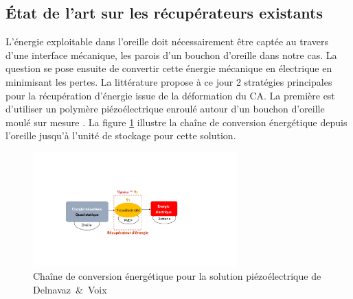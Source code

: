 	\subsection{État de l'art sur les récupérateurs existants}
	\label{subsec:1.4.3_Etat de l art sur les recuperateurs existants}
L'énergie exploitable dans l'oreille doit nécessairement être captée au travers d'une interface mécanique, les parois d'un bouchon d'oreille dans notre cas. La question se pose ensuite de convertir cette énergie mécanique en électrique en minimisant les pertes. La littérature propose à ce jour 2 stratégies principales pour la récupération d'énergie issue de la déformation du CA. La première est d'utiliser un polymère piézoélectrique enroulé autour d'un bouchon d'oreille moulé sur mesure \cite{Delnavaz2013}. La figure \ref{fig:conversion_critias_pvdf} illustre la chaîne de conversion énergétique depuis l'oreille jusqu'à l'unité de stockage pour cette solution.
\begin{figure}[!htbp]
\begin{center}
    \captionsetup{justification=centering}
	\includegraphics[trim={5cm 5cm 7cm 6cm},clip, width=0.7\textwidth]{../Chap2/Figure/conversion_critias_pvdf.pdf}
	\caption{Chaîne de conversion énergétique pour la solution piézoélectrique de \mbox{Delnavaz \& Voix \cite{Delnavaz2013}}}
	\label{fig:conversion_critias_pvdf}
\end{center}
\end{figure}
